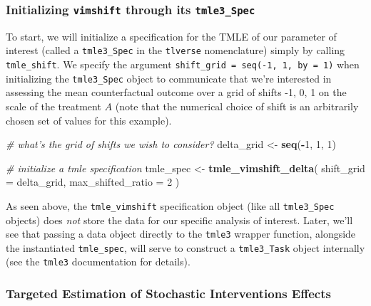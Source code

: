 \documentclass[12pt, krantz2,]{krantz}
\newenvironment{Shaded}{\begin{snugshade}}{\end{snugshade}}
\newcommand{\CommentTok}[1]{\textcolor[rgb]{0.37,0.37,0.37}{\textit{#1}}}
\newcommand{\DataTypeTok}[1]{\textcolor[rgb]{0.27,0.27,0.27}{#1}}
\newcommand{\DecValTok}[1]{\textcolor[rgb]{0.06,0.06,0.06}{#1}}
\newcommand{\KeywordTok}[1]{\textcolor[rgb]{0.27,0.27,0.27}{\textbf{#1}}}
\newcommand{\NormalTok}[1]{#1}
\newcommand{\OperatorTok}[1]{\textcolor[rgb]{0.43,0.43,0.43}{\textbf{#1}}}
\newcommand{\StringTok}[1]{\textcolor[rgb]{0.5,0.5,0.5}{#1}}
\theoremstyle{definition}
\theoremstyle{definition}
\theoremstyle{definition}
\newcommand{\1}{\mathbbm{1}}
\begin{document}
\hypertarget{initializing-vimshift-through-its-tmle3_spec}{%
\subsubsection{\texorpdfstring{Initializing \texttt{vimshift} through its \texttt{tmle3\_Spec}}{Initializing vimshift through its tmle3\_Spec}}\label{initializing-vimshift-through-its-tmle3_spec}}

To start, we will initialize a specification for the TMLE of our parameter of
interest (called a \texttt{tmle3\_Spec} in the \texttt{tlverse} nomenclature) simply by calling
\texttt{tmle\_shift}. We specify the argument \texttt{shift\_grid\ =\ seq(-1,\ 1,\ by\ =\ 1)}
when initializing the \texttt{tmle3\_Spec} object to communicate that we're interested
in assessing the mean counterfactual outcome over a grid of shifts -1, 0, 1 on the scale of the treatment \(A\) (note that the numerical
choice of shift is an arbitrarily chosen set of values for this example).

\begin{Shaded}
\begin{Highlighting}[]
\CommentTok{# what's the grid of shifts we wish to consider?}
\NormalTok{delta_grid <-}\StringTok{ }\KeywordTok{seq}\NormalTok{(}\OperatorTok{-}\DecValTok{1}\NormalTok{, }\DecValTok{1}\NormalTok{, }\DecValTok{1}\NormalTok{)}

\CommentTok{# initialize a tmle specification}
\NormalTok{tmle_spec <-}\StringTok{ }\KeywordTok{tmle_vimshift_delta}\NormalTok{(}
  \DataTypeTok{shift_grid =}\NormalTok{ delta_grid,}
  \DataTypeTok{max_shifted_ratio =} \DecValTok{2}
\NormalTok{)}
\end{Highlighting}
\end{Shaded}

As seen above, the \texttt{tmle\_vimshift} specification object (like all \texttt{tmle3\_Spec}
objects) does \emph{not} store the data for our specific analysis of interest. Later,
we'll see that passing a data object directly to the \texttt{tmle3} wrapper function,
alongside the instantiated \texttt{tmle\_spec}, will serve to construct a \texttt{tmle3\_Task}
object internally (see the \texttt{tmle3} documentation for details).

\hypertarget{targeted-estimation-of-stochastic-interventions-effects-1}{%
\subsubsection{Targeted Estimation of Stochastic Interventions Effects}\label{targeted-estimation-of-stochastic-interventions-effects-1}}
\end{document}
